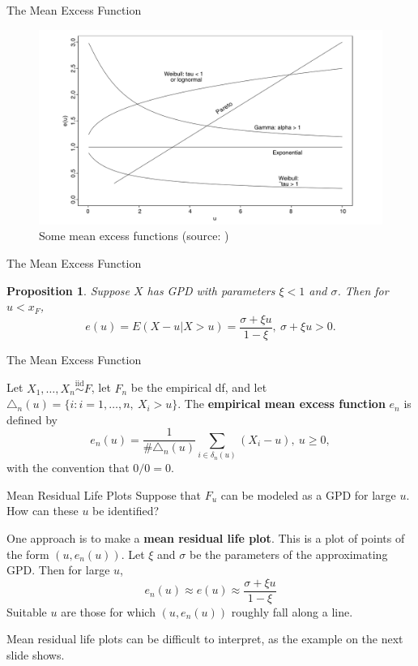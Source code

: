 \documentclass{beamer}
\newtheorem{proposition}{Proposition}
\begin{document}
\begin{frame}{The Mean Excess Function}
    \begin{figure}
        \centering
        \includegraphics[scale=0.32]{mean_excess_functions.png}
        \caption{Some mean excess functions (source: \cite{embrechts_et_al_1997})}
        \label{fig:mean_excess_functions}
    \end{figure}
\end{frame}

\begin{frame}{The Mean Excess Function}
    \begin{proposition}
        Suppose $X$ has GPD with parameters $\xi < 1$ and $\sigma$. Then for $u < x_F$,
        \[
        e(u) = E(X - u | X > u) = \frac{\sigma + \xi u}{1 - \xi}, \ \sigma + \xi u > 0.
        \]
    \end{proposition}
\end{frame}

\begin{frame}{The Mean Excess Function}
    \begin{definition}
        Let $X_1, \ldots, X_n \overset{\text{iid}}{\sim} F$, let $F_n$ be the empirical df, and let $\triangle_n(u) = \{i : i = 1, \ldots, n, \ X_i > u\}$. The \textbf{empirical mean excess function} $e_n$ is defined by
        \[
        e_n(u) = \frac{1}{\#\triangle_n(u)}\sum_{i \in \delta_n(u)} (X_i - u), \ u \ge 0,
        \]
        with the convention that $0 / 0 = 0$.
    \end{definition}
\end{frame}

\begin{frame}{Mean Residual Life Plots}
    Suppose that $F_u$ can be modeled as a GPD for large $u$. How can these $u$ be identified?

    \smallskip

    One approach is to make a \textbf{mean residual life plot}. This is a plot of points of the form $(u, e_n(u))$. Let $\xi$ and $\sigma$ be the parameters of the approximating GPD. Then for large $u$,
    \[
    e_n(u) \approx e(u) \approx \frac{\sigma + \xi u}{1 - \xi}
    \]
    Suitable $u$ are those for which $(u, e_n(u))$ roughly fall along a line.

    \smallskip

    Mean residual life plots can be difficult to interpret, as the example on the next slide shows.
\end{frame}
\end{document}
